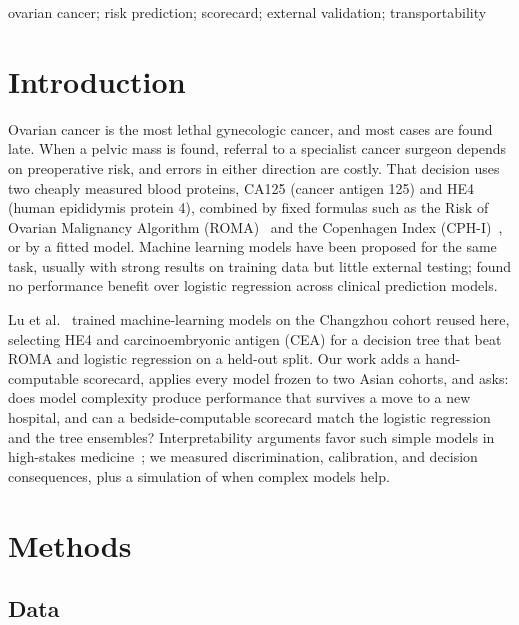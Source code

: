 \documentclass[conference]{IEEEtran}
\begin{document}
\begin{IEEEkeywords}
ovarian cancer; risk prediction; scorecard; external validation;
transportability
\end{IEEEkeywords}

\section{Introduction}

Ovarian cancer is the most lethal gynecologic cancer, and most cases
are found late. When a pelvic mass is found, referral to a specialist
cancer surgeon depends on preoperative risk, and errors in either
direction are costly. That decision uses two cheaply measured blood
proteins, CA125 (cancer antigen 125) and HE4 (human epididymis
protein 4), combined by fixed formulas such as the Risk of Ovarian
Malignancy Algorithm (ROMA)~\cite{moore2011} and the Copenhagen Index
(CPH-I)~\cite{karlsen2015}, or by a fitted model. Machine learning
models have been proposed for the same task, usually with strong
results on training data but little external testing;
\cite{christodoulou2019} found no performance benefit over logistic
regression across clinical prediction models.

Lu et al.~\cite{lu2020} trained machine-learning models on the
Changzhou cohort reused here, selecting HE4 and carcinoembryonic
antigen (CEA) for a decision tree that beat ROMA and logistic
regression on a held-out split. Our work adds a hand-computable
scorecard, applies every model frozen to two Asian cohorts, and asks:
does model complexity produce performance that survives a move to a
new hospital, and can a bedside-computable scorecard match the
logistic regression and the tree ensembles? Interpretability
arguments favor such simple models in high-stakes
medicine~\cite{rudin2019}; we measured discrimination,
calibration, and decision consequences, plus a simulation of when
complex models help.

\section{Methods}

\subsection{Data}
\end{document}
